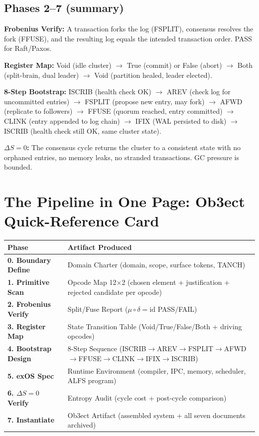 \documentclass[12pt,a4paper]{article}
\begin{document}
\subsection*{Phases 2--7 (summary)}

\textbf{Frobenius Verify:} A transaction forks the log (FSPLIT), consensus resolves
the fork (FFUSE), and the resulting log equals the intended transaction order.
PASS for Raft/Paxos.

\textbf{Register Map:} Void (idle cluster) $\to$ True (commit) or False (abort)
$\to$ Both (split-brain, dual leader) $\to$ Void (partition healed, leader elected).

\textbf{8-Step Bootstrap:} ISCRIB (health check OK) $\to$ AREV (check log for
uncommitted entries) $\to$ FSPLIT (propose new entry, may fork) $\to$ AFWD (replicate
to followers) $\to$ FFUSE (quorum reached, entry committed) $\to$ CLINK (entry
appended to log chain) $\to$ IFIX (WAL persisted to disk) $\to$ ISCRIB (health check
still OK, same cluster state).

\textbf{$\Delta S = 0$:} The consensus cycle returns the cluster to a consistent
state with no orphaned entries, no memory leaks, no stranded transactions. GC
pressure is bounded.

\section{The Pipeline in One Page: Ob3ect Quick-Reference Card}

{\small
\begin{tabularx}{\textwidth}{>{\bfseries}p{3.2cm} X}
\toprule
{\bf Phase} & {\bf Artifact Produced} \\
\midrule
0. Boundary Define & Domain Charter (domain, scope, surface tokens, TANCH) \\
1. Primitive Scan & Opcode Map 12$\times$2 (chosen element + justification +
    rejected candidate per opcode) \\
2. Frobenius Verify & Split/Fuse Report ($\mu \circ \delta = \mathrm{id}$ PASS/FAIL) \\
3. Register Map & State Transition Table (Void/True/False/Both + driving opcodes) \\
4. Bootstrap Design & 8-Step Sequence (ISCRIB$\to$AREV$\to$FSPLIT$\to$AFWD$\to$FFUSE$\to$CLINK$\to$IFIX$\to$ISCRIB) \\
5. exOS Spec & Runtime Environment (compiler, IPC, memory, scheduler, ALFS program) \\
6. $\Delta S = 0$ Verify & Entropy Audit (cycle cost + post-cycle comparison) \\
7. Instantiate & Ob3ect Artifact (assembled system + all seven documents archived) \\
\bottomrule
\end{tabularx}
}
\end{document}
